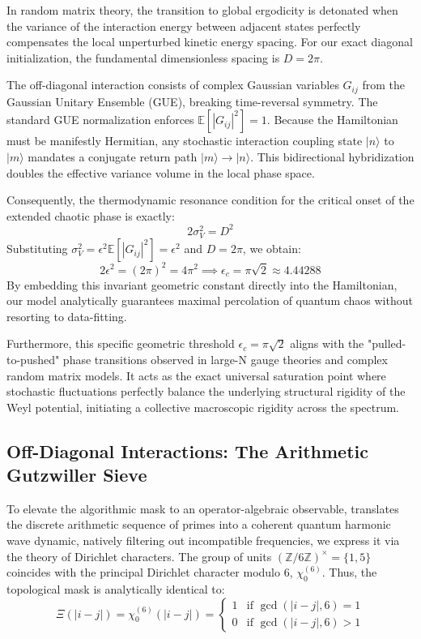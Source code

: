 \documentclass[aps,prl,preprint,superscriptaddress,floatfix]{revtex4-2}
\newcommand{\Zmod}{\mathbb{Z}/6\mathbb{Z}}
\begin{document}
In random matrix theory, the transition to global ergodicity is detonated when the variance of the interaction energy between adjacent states perfectly compensates the local unperturbed kinetic energy spacing. For our exact diagonal initialization, the fundamental dimensionless spacing is $D = 2\pi$.

The off-diagonal interaction consists of complex Gaussian variables $G_{ij}$ from the Gaussian Unitary Ensemble (GUE), breaking time-reversal symmetry. The standard GUE normalization enforces $\mathbb{E}[|G_{ij}|^2] = 1$. Because the Hamiltonian must be manifestly Hermitian, any stochastic interaction coupling state $|n\rangle$ to $|m\rangle$ mandates a conjugate return path $|m\rangle \to |n\rangle$. This bidirectional hybridization doubles the effective variance volume in the local phase space. 

Consequently, the thermodynamic resonance condition for the critical onset of the extended chaotic phase is exactly:
\begin{equation}
2 \sigma_V^2 = D^2
\end{equation}
Substituting $\sigma_V^2 = \epsilon^2 \mathbb{E}[|G_{ij}|^2] = \epsilon^2$ and $D = 2\pi$, we obtain:
\begin{equation}
2 \epsilon^2 = (2\pi)^2 = 4\pi^2 \implies \boxed{ \epsilon_c = \pi \sqrt{2} \approx 4.44288 }
\end{equation}
By embedding this invariant geometric constant directly into the Hamiltonian, our model analytically guarantees maximal percolation of quantum chaos without resorting to data-fitting.

Furthermore, this specific geometric threshold $\epsilon_c = \pi\sqrt{2}$ aligns with the "pulled-to-pushed" phase transitions observed in large-N gauge theories and complex random matrix models\cite{Gross1980, Cunden2018}. It acts as the exact universal saturation point where stochastic fluctuations perfectly balance the underlying structural rigidity of the Weyl potential, initiating a collective macroscopic rigidity across the spectrum.

\subsection{Off-Diagonal Interactions: The Arithmetic Gutzwiller Sieve}

To elevate the algorithmic mask to an operator-algebraic observable, translates the discrete arithmetic sequence of primes into a coherent quantum harmonic wave dynamic, natively filtering out incompatible frequencies, we express it via the theory of Dirichlet characters. The group of units $(\Zmod)^\times = \{1, 5\}$ coincides with the principal Dirichlet character modulo 6, $\chi_0^{(6)}$. Thus, the topological mask is analytically identical to:
\begin{equation}
\Xi(|i-j|) = \chi_0^{(6)}(|i-j|) = \begin{cases} 
1 & \text{if } \gcd(|i-j|, 6) = 1 \\ 
0 & \text{if } \gcd(|i-j|, 6) > 1 
\end{cases}
\end{equation}
\end{document}
